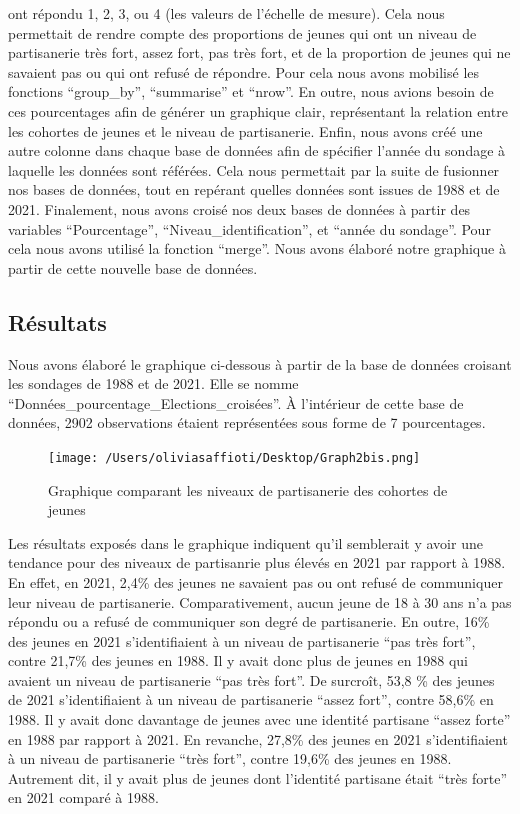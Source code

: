 \documentclass[
  letterpaper,
  DIV=11,
  numbers=noendperiod]{scrartcl}
\begin{document}
ont répondu 1, 2, 3, ou 4 (les valeurs de l'échelle de mesure). Cela
nous permettait de rendre compte des proportions de jeunes qui ont un
niveau de partisanerie très fort, assez fort, pas très fort, et de la
proportion de jeunes qui ne savaient pas ou qui ont refusé de répondre.
Pour cela nous avons mobilisé les fonctions ``group\_by'', ``summarise''
et ``nrow''. En outre, nous avions besoin de ces pourcentages afin de
générer un graphique clair, représentant la relation entre les cohortes
de jeunes et le niveau de partisanerie. Enfin, nous avons créé une autre
colonne dans chaque base de données afin de spécifier l'année du sondage
à laquelle les données sont référées. Cela nous permettait par la suite
de fusionner nos bases de données, tout en repérant quelles données sont
issues de 1988 et de 2021. Finalement, nous avons croisé nos deux bases
de données à partir des variables ``Pourcentage'',
``Niveau\_identification'', et ``année du sondage''. Pour cela nous
avons utilisé la fonction ``merge''. Nous avons élaboré notre graphique
à partir de cette nouvelle base de données.

\hypertarget{ruxe9sultats}{%
\subsection{Résultats}\label{ruxe9sultats}}

Nous avons élaboré le graphique ci-dessous à partir de la base de
données croisant les sondages de 1988 et de 2021. Elle se nomme
``Données\_pourcentage\_Elections\_croisées''. À l'intérieur de cette
base de données, 2902 observations étaient représentées sous forme de 7
pourcentages.

\begin{figure}

{\centering \texttt{[image: /Users/oliviasaffioti/Desktop/Graph2bis.png]}

}

\caption{Graphique comparant les niveaux de partisanerie des cohortes de
jeunes}

\end{figure}

Les résultats exposés dans le graphique indiquent qu'il semblerait y
avoir une tendance pour des niveaux de partisanrie plus élevés en 2021
par rapport à 1988. En effet, en 2021, 2,4\% des jeunes ne savaient pas
ou ont refusé de communiquer leur niveau de partisanerie.
Comparativement, aucun jeune de 18 à 30 ans n'a pas répondu ou a refusé
de communiquer son degré de partisanerie. En outre, 16\% des jeunes en
2021 s'identifiaient à un niveau de partisanerie ``pas très fort'',
contre 21,7\% des jeunes en 1988. Il y avait donc plus de jeunes en 1988
qui avaient un niveau de partisanerie ``pas très fort''. De surcroît,
53,8 \% des jeunes de 2021 s'identifiaient à un niveau de partisanerie
``assez fort'', contre 58,6\% en 1988. Il y avait donc davantage de
jeunes avec une identité partisane ``assez forte'' en 1988 par rapport à
2021. En revanche, 27,8\% des jeunes en 2021 s'identifiaient à un niveau
de partisanerie ``très fort'', contre 19,6\% des jeunes en 1988.
Autrement dit, il y avait plus de jeunes dont l'identité partisane était
``très forte'' en 2021 comparé à 1988.
\end{document}
